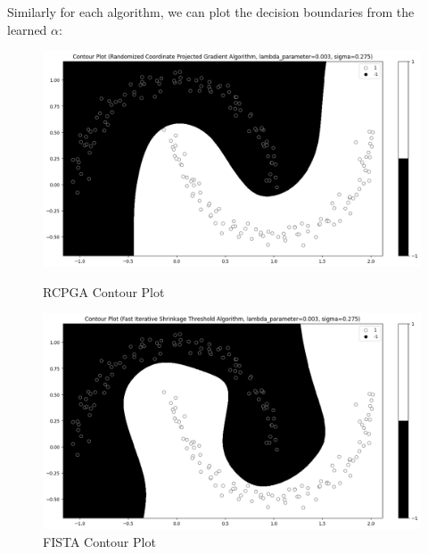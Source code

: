 \documentclass[12pt]{article}
\begin{document}
Similarly for each algorithm, we can plot the decision boundaries from the learned $\alpha$:
\begin{figure}[h]
\centering
\begin{minipage}{.5\textwidth}
  \centering
\includegraphics[scale=0.28]{outputs/part_4/rcpga-contour}
\caption{RCPGA Contour Plot}
\label{fig:}
\end{minipage}%
\begin{minipage}{.5\textwidth}
  \centering
\includegraphics[scale=0.28]{outputs/part_4/fista-contour}
\caption{FISTA Contour Plot}
\label{fig:}
\end{minipage}
\end{figure}
\end{document}
